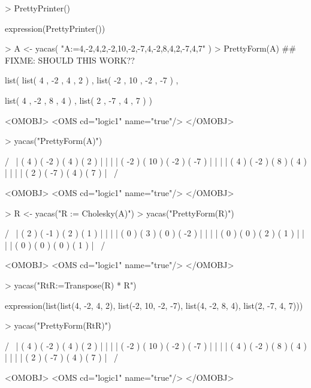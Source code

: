 \documentclass[10pt]{article}
\begin{document}
\begin{Schunk}
\begin{Sinput}
> PrettyPrinter()
\end{Sinput}
\begin{Soutput}
expression(PrettyPrinter())
\end{Soutput}
\end{Schunk}


\begin{Schunk}
\begin{Sinput}
> A <- yacas( "A:={{4,-2,4,2},{-2,10,-2,-7},{4,-2,8,4},{2,-7,4,7}}" )
> PrettyForm(A) ## FIXME: SHOULD THIS WORK??
\end{Sinput}
\begin{Soutput}
list( list( 4 , -2 , 4 , 2 ) , list( -2 , 10 , -2 , -7 ) , 

list( 4 , -2 , 8 , 4 ) , list( 2 , -7 , 4 , 7 ) )

<OMOBJ>
  <OMS cd="logic1" name="true"/>
</OMOBJ>
\end{Soutput}
\begin{Sinput}
> yacas("PrettyForm(A)")
\end{Sinput}
\begin{Soutput}
/                              \
| ( 4 )  ( -2 ) ( 4 )  ( 2 )   |
|                              |
| ( -2 ) ( 10 ) ( -2 ) ( -7 )  |
|                              |
| ( 4 )  ( -2 ) ( 8 )  ( 4 )   |
|                              |
| ( 2 )  ( -7 ) ( 4 )  ( 7 )   |
\                              /

<OMOBJ>
  <OMS cd="logic1" name="true"/>
</OMOBJ>
\end{Soutput}
\begin{Sinput}
> R <- yacas("R := Cholesky(A)")
> yacas("PrettyForm(R)")
\end{Sinput}
\begin{Soutput}
/                            \
| ( 2 ) ( -1 ) ( 2 ) ( 1 )   |
|                            |
| ( 0 ) ( 3 )  ( 0 ) ( -2 )  |
|                            |
| ( 0 ) ( 0 )  ( 2 ) ( 1 )   |
|                            |
| ( 0 ) ( 0 )  ( 0 ) ( 1 )   |
\                            /

<OMOBJ>
  <OMS cd="logic1" name="true"/>
</OMOBJ>
\end{Soutput}
\begin{Sinput}
> yacas("RtR:=Transpose(R) * R")
\end{Sinput}
\begin{Soutput}
expression(list(list(4, -2, 4, 2), list(-2, 10, -2, -7), list(4, 
    -2, 8, 4), list(2, -7, 4, 7)))
\end{Soutput}
\begin{Sinput}
> yacas("PrettyForm(RtR)")
\end{Sinput}
\begin{Soutput}
/                              \
| ( 4 )  ( -2 ) ( 4 )  ( 2 )   |
|                              |
| ( -2 ) ( 10 ) ( -2 ) ( -7 )  |
|                              |
| ( 4 )  ( -2 ) ( 8 )  ( 4 )   |
|                              |
| ( 2 )  ( -7 ) ( 4 )  ( 7 )   |
\                              /

<OMOBJ>
  <OMS cd="logic1" name="true"/>
</OMOBJ>
\end{Soutput}
\end{Schunk}
\end{document}
